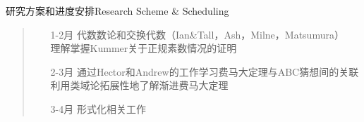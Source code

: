 \documentclass[aspectratio=169]{beamer}
\begin{document}
	\begin{frame}{研究方案和进度安排}{Research Scheme \& Scheduling}
    \begin{quote}
            \begin{itemize}
                \item[1-2月] 
                代数数论和交换代数（Ian\&Tall，Ash，Milne，Matsumura）\\
                \vspace{3pt}
                理解掌握Kummer关于正规素数情况的证明
                \vspace{10pt}
                \item[2-3月]
                通过Hector和Andrew的工作学习费马大定理与ABC猜想间的关联\\
                \vspace{3pt}
                利用类域论拓展性地了解渐进费马大定理
                \vspace{10pt}
                \item[3-4月] 形式化相关工作
            \end{itemize}
    \end{quote}
    \end{frame}
\end{document}

